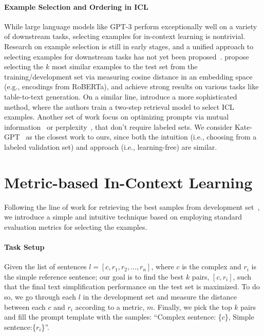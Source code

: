\documentclass[11pt]{article}
\begin{document}
\paragraph{Example Selection and Ordering in ICL} While large language models like GPT-$3$ perform exceptionally well on a variety of downstream tasks, selecting examples for in-context learning is nontrivial. Research on example selection is still in early stages, and a unified approach to selecting examples for downstream tasks has not yet been proposed~\citep{surveyICL}. \citet{kategpt} propose selecting the $k$ most similar examples to the test set from the training/development set via measuring cosine distance in an embedding space (e.g., encodings from RoBERTa), and achieve strong results on various tasks like table-to-text generation. On a similar line, \citet{rubin-etal-2022-learning} introduce a more sophisticated method, where the authors train a two-step retrieval model to select ICL examples. Another set of work focus on optimizing prompts via mutual information~\citep{SorensenRRSRDKF22} or perplexity~\citep{Gonen22}, that don't require labeled sets. We consider Kate-GPT~\citep{kategpt} as the closest work to ours, since both the intuition (i.e., choosing from a labeled validation set) and approach (i.e., learning-free) are similar. 

 

\section{Metric-based In-Context Learning}
Following the line of work for retrieving the best samples from development set~\cite{kategpt,SorensenRRSRDKF22}, we introduce a simple and intuitive technique based on employing standard evaluation metrics for selecting the examples. 

\paragraph{Task Setup} Given the list of sentences $l = [c, r_1, r_2,..., r_n]$, where $c$ is the complex and $r_i$ is the simple reference sentence; our goal is to find the best $k$ pairs, $[c, r_i]$, such that the final text simplification performance on the test set is maximized. To do so, we go through each $l$ in the development set and measure the distance between each $c$ and $r_i$ according to a metric, $m$. Finally, we pick the top $k$ pairs and fill the prompt template with the samples: ``Complex sentence: \{$c$\}, Simple sentence:\{$r_i$\}''.    
\end{document}
